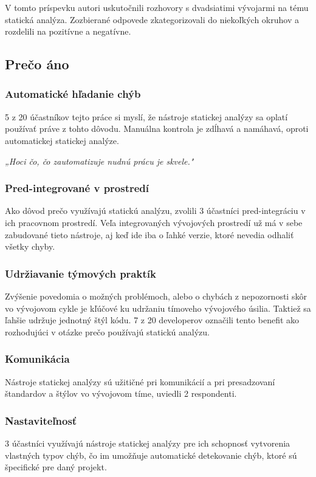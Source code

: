 \documentclass[10pt,twoside,slovak,a4paper]{article}
\begin{document}
V tomto príspevku autori uskutočnili rozhovory s dvadsiatimi vývojarmi na tému statická analýza. Zozbierané odpovede
zkategorizovali do niekoľkých okruhov a rozdelili na pozitívne a negatívne.

\subsection{Prečo áno} \label{vyuzitie:benefity}
\subsubsection*{Automatické hľadanie chýb}
5 z 20 účastníkov tejto práce si myslí, že nástroje statickej analýzy sa oplatí používať práve z tohto dôvodu.
Manuálna kontrola je zdĺhavá a namáhavá, oproti automatickej statickej analýze.

\emph{„Hoci čo, čo zautomatizuje nudnú prácu je skvele."}

\subsubsection*{Pred-integrované v prostredí}
Ako dôvod prečo využívajú statickú analýzu, zvolili 3 účastníci pred-integráciu v ich pracovnom prostredí. Veľa
integrovaných vývojových prostredí už má v sebe zabudované tieto nástroje, aj keď ide iba o ľahké verzie, ktoré nevedia
odhaliť všetky chyby.

\subsubsection*{Udržiavanie týmových praktík}
Zvýšenie povedomia o možných problémoch, alebo o chybách z nepozornosti skôr vo vývojovom cykle je kľúčové ku udržaniu
tímoveho vývojového úsilia. Taktiež sa ľahšie udržuje jednotný štýl kódu. 7 z 20 developerov označili tento benefit ako
rozhodujúci v otázke prečo používajú statickú analýzu.

\subsubsection*{Komunikácia}
Nástroje statickej analýzy sú užitičné pri komunikácií a pri presadzovaní štandardov a štýlov vo vývojovom tíme,
uviedli 2 respondenti.

\subsubsection*{Nastaviteľnosť}
3 účastníci využívajú nástroje statickej analýzy pre ich schopnosť vytvorenia vlastných typov chýb, čo im umožňuje
automatické detekovanie chýb, ktoré sú špecifické pre daný projekt.
\end{document}
